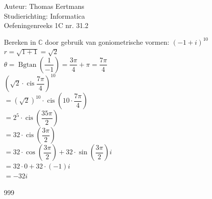 \documentclass[a4paper]{article}
\begin{document}
  
\noindent \large Auteur: Thomas Eertmans \\
\noindent \large Studierichting: Informatica\\
\noindent \large Oefeningenreeks 1C nr. 31.2\\
\newcommand{\Bgtan}{\operatorname{Bgtan}}
\newcommand{\cis}{\operatorname{cis}}
\medskip

\normalsize

Bereken in $\mathbb{C}$ door gebruik van goniometrische vormen: $(-1+i)^{10}$ \\

$r = \sqrt{1+1} = \sqrt{2}$ \\

$\theta = \Bgtan\left(\dfrac{1}{-1}\right) = \dfrac{3\pi}{4} + \pi = \dfrac{7\pi}{4}$ \\

$\left(\sqrt{2} \cdot \cis \dfrac{7\pi}{4}\right)^{10}$ \\

$= \left(\sqrt{2}\right)^{10} \cdot \cis \left(10 \cdot \dfrac{7\pi}{4}\right)$ \\

$= 2^5 \cdot \cis \left(\dfrac{35\pi}{2}\right)$ \\

$= 32 \cdot \cis \left(\dfrac{3\pi}{2}\right)$  \\

$= 32 \cdot \cos \left(\dfrac{3\pi}{2}\right) + 32 \cdot \sin \left(\dfrac{3\pi}{2}\right)i$ \\

$= 32 \cdot 0 + 32 \cdot (-1)i$ \\

$= -32i$ \\

\begin{thebibliography}{999}
\end{thebibliography}
\end{document}
